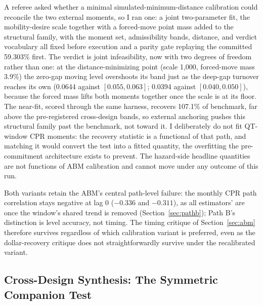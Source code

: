 \documentclass[12pt]{article}
\begin{document}
A referee asked whether a minimal simulated-minimum-distance calibration could reconcile the two external moments, so I ran one: a joint two-parameter fit, the mobility-desire scale together with a forced-move point mass added to the structural family, with the moment set, admissibility bands, distance, and verdict vocabulary all fixed before execution and a parity gate replaying the committed 59.303\% first. The verdict is joint infeasibility, now with two degrees of freedom rather than one: at the distance-minimizing point (scale 1{,}000, forced-move mass 3.9\%) the zero-gap moving level overshoots its band just as the deep-gap turnover reaches its own (0.0644 against $[0.055, 0.063]$; 0.0394 against $[0.040, 0.050]$), because the forced mass lifts both moments together once the scale is at its floor. The near-fit, scored through the same harness, recovers 107.1\% of benchmark, far above the pre-registered cross-design bands, so external anchoring pushes this structural family past the benchmark, not toward it. I deliberately do not fit QT-window CPR moments: the recovery statistic is a functional of that path, and matching it would convert the test into a fitted quantity, the overfitting the pre-commitment architecture exists to prevent. The hazard-side headline quantities are not functions of ABM calibration and cannot move under any outcome of this run.

Both variants retain the ABM's central path-level failure: the monthly CPR path correlation stays negative at lag 0 ($-0.336$ and $-0.311$), as all estimators' are once the window's shared trend is removed (Section~\ref{sec:pathb}); Path B's distinction is level accuracy, not timing. The timing critique of Section~\ref{sec:abm} therefore survives regardless of which calibration variant is preferred, even as the dollar-recovery critique does not straightforwardly survive under the recalibrated variant.

\subsection{Cross-Design Synthesis: The Symmetric Companion Test}\label{sec:robustness-synthesis}
\end{document}
